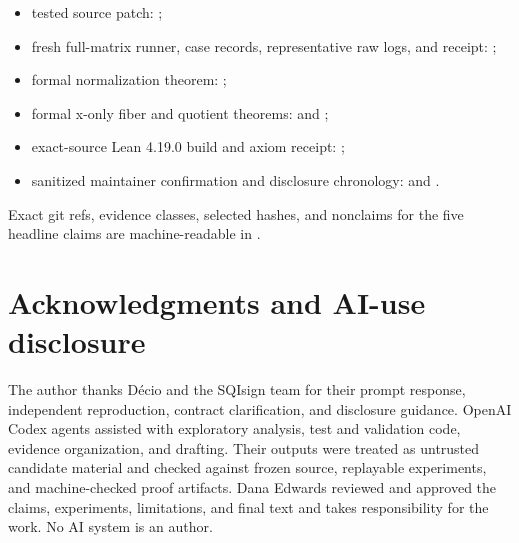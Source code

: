 \documentclass[11pt]{article}
\begin{document}
\begin{sloppypar}
\begin{itemize}
  \item tested source patch:
    ;
  \item fresh full-matrix runner, case records, representative raw logs, and
    receipt: ;
  \item formal normalization theorem:
    ;
  \item formal x-only fiber and quotient theorems:
    and
    ;
  \item exact-source Lean 4.19.0 build and axiom receipt:
    ;
  \item sanitized maintainer confirmation and disclosure chronology:
     and
    .
\end{itemize}
\end{sloppypar}

Exact git refs, evidence classes, selected hashes, and nonclaims for the five
headline claims are machine-readable in .

\section*{Acknowledgments and AI-use disclosure}

The author thanks D\'ecio and the SQIsign team for their
prompt response, independent reproduction, contract clarification, and
disclosure guidance.  OpenAI Codex agents assisted with exploratory analysis,
test and validation code, evidence organization, and drafting.  Their outputs
were treated as untrusted candidate material and checked against frozen source,
replayable experiments, and machine-checked proof artifacts.  Dana Edwards
reviewed and approved the claims, experiments, limitations, and final text and
takes responsibility for the work.  No AI system is an author.

{\small


}
\end{document}
